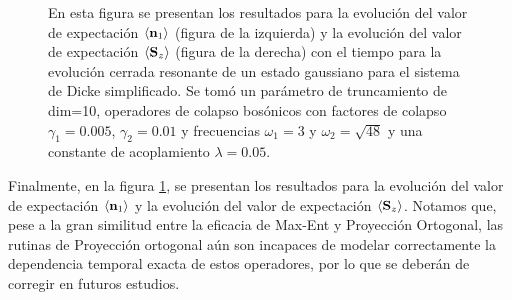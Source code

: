 \documentclass{report} %
\newcommand{\lgg}{\langle}
\newcommand{\rgg}{\rangle}
\numberwithin{equation}{section}
\begin{document}
\begin{figure}
    \centering
    \qquad
    \caption{En esta figura se presentan los resultados para la evolución del valor de expectación $\lgg { \bf n}_1 \rgg$ (figura de la izquierda) y la evolución del valor de expectación $\lgg { \bf S}_z \rgg$ (figura de la derecha) con el tiempo para la evolución cerrada resonante de un estado gaussiano para el sistema de Dicke simplificado. Se tomó un parámetro de truncamiento de dim=10, operadores de colapso bosónicos con factores de colapso $\gamma_1 = 0.005$, $\gamma_2 = 0.01$ y frecuencias $\omega_1 = 3$ y $\omega_2 = \sqrt{48}$ y una constante de acoplamiento $\lambda = 0.05$.}
    \label{ocupations_open_res}
\end{figure}

Finalmente, en la figura \ref{ocupations_open_res}, se presentan los resultados para la evolución del valor de expectación $\lgg {\bf n}_1 \rgg$ y la evolución del valor de expectación $\lgg {\bf S}_z \rgg$. Notamos que, pese a la gran similitud entre la eficacia de Max-Ent y Proyección Ortogonal, las rutinas de Proyección ortogonal aún son incapaces de modelar correctamente la dependencia temporal exacta de estos operadores, por lo que se deberán de corregir en futuros estudios.
\end{document}
